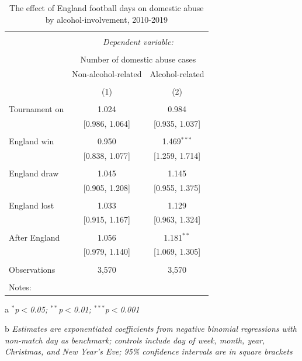 \documentclass[12pt, a4paper]{article}
\begin{document}
\begin{table}[!htbp] \centering 
  \begin{threeparttable}
  \caption{The effect of England football days on domestic abuse by alcohol-involvement, 2010-2019} 
  \label{coremodel} 
\begin{tabular}{@{\extracolsep{5pt}}lcc} 
\\[-1.8ex]\hline 
\hline \\[-1.8ex] 
 & \multicolumn{2}{c}{\textit{Dependent variable:}} \\ 
\cline{2-3} 
\\[-1.8ex] & \multicolumn{2}{c}{Number of domestic abuse cases} \\ 
 & Non-alcohol-related & Alcohol-related\\ 
\\[-1.8ex] & (1) & (2)\\ 
\hline \\[-1.8ex] 
 Tournament on & 1.024 & 0.984 \\ 
  & [0.986, 1.064] & [0.935, 1.037] \\ 
  & & \\ 
 England win & 0.950 & 1.469$^{***}$ \\ 
  & [0.838, 1.077] & [1.259, 1.714] \\ 
  & & \\ 
 England draw & 1.045 & 1.145 \\ 
  & [0.905, 1.208] & [0.955, 1.375] \\ 
  & & \\ 
 England lost & 1.033 & 1.129 \\ 
  & [0.915, 1.167] & [0.963, 1.324] \\ 
  & & \\ 
 After England  & 1.056 & 1.181$^{**}$ \\ 
  & [0.979, 1.140] & [1.069, 1.305] \\ 
\hline \\[-1.8ex] 
Observations & 3,570 & 3,570 \\ 
\hline 
\hline \\[-1.8ex] 
Notes:
\end{tabular} 
\begin{tablenotes}
      \item[a] \textit{$^{*}$p$<$0.05; $^{**}$p$<$0.01; $^{***}$p$<$0.001}
      \item[b] \textit{Estimates are exponentiated coefficients from negative binomial regressions with non-match day as benchmark; controls include day of week, month, year, Christmas, and New Year's Eve; 95\% confidence intervals are in square brackets}
    \end{tablenotes}
\end{threeparttable} 
\end{table}
\end{document}
